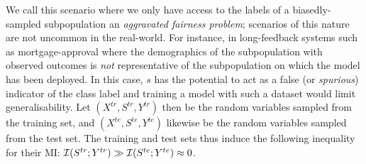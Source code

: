 We call this scenario where we only have access to the labels of a biasedly-sampled subpopulation
an \emph{aggravated fairness problem}; scenarios of this nature are not uncommon in the real-world. 
%
For instance, in long-feedback systems such as mortgage-approval where the demographics of the
subpopulation with observed outcomes is \emph{not} representative of the subpopulation on which the
model has been deployed. 
%
In this case, $s$ has the potential to act as a false (or \emph{spurious}) indicator of the class
label and training a model with such a dataset would limit generalisability. 
%
Let \( (X^{tr}, S^{tr}, Y^{tr}) \) then be the random variables sampled from the training set, and
\( (X^{te}, S^{te}, Y^{te}) \) likewise be the random variables sampled from the test set.
%
The training and test sets thus induce the following inequality for their \ac{MI}:
\( {\mathcal{I}}(S^{tr}; Y^{tr}) \gg {\mathcal{I}}(S^{te}; Y^{te}) \approx 0 \).

